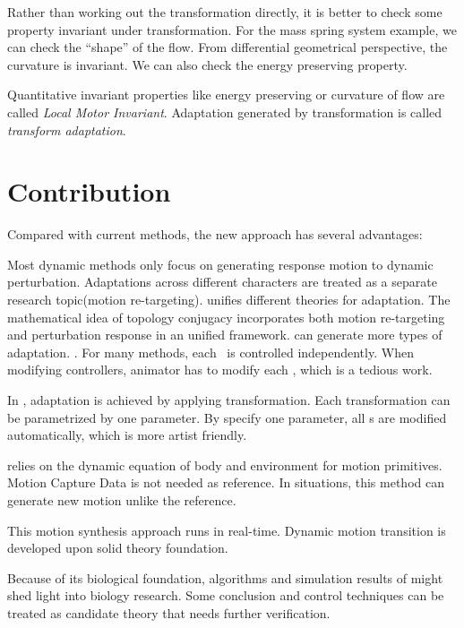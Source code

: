 Rather than working out the transformation directly,
it is better to check some property invariant under transformation.
For the mass spring system example, we can check the ``shape'' of the flow.
From differential geometrical perspective,  the curvature is invariant.
We can also check the energy preserving property. 
 


Quantitative invariant properties like energy preserving or curvature of flow are called \emph{Local Motor Invariant}. 
Adaptation generated by transformation is called \emph{transform adaptation}.

\section{Contribution}

Compared with current \cms methods, the new approach has several advantages:
\begin{enumerate}
Most dynamic methods only focus on generating response motion to dynamic perturbation.
Adaptations across different characters are treated as a separate  research topic(motion re-targeting).
\moit unifies different theories for adaptation.
The mathematical idea of topology conjugacy  incorporates both motion re-targeting and  perturbation response  in an unified framework.
\moit can generate more types of adaptation.
.
For many \cms methods, each \dof ~is controlled independently.
When modifying controllers, animator has to modify each \dof, which is a tedious work.

In \moit, adaptation is achieved by applying transformation.
Each transformation can be parametrized by one parameter.
By specify one parameter, all \dof s are modified automatically, which is more artist friendly.

\moit relies on the dynamic equation of body and environment for motion primitives.
Motion Capture Data is not needed as reference.
In situations, this method can generate new motion unlike the reference.


This motion synthesis approach runs in real-time.
Dynamic motion transition is developed upon solid theory foundation.

\end{enumerate}

Because of its biological foundation,
algorithms and simulation results of \moit  might shed light into biology research.
Some conclusion and control techniques can be treated as candidate theory that needs further verification.

